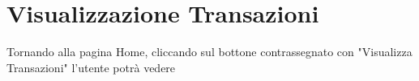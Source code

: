 \section{Visualizzazione Transazioni}

Tornando alla pagina Home, cliccando sul bottone contrassegnato con "Visualizza Transazioni" l'utente potrà vedere 
